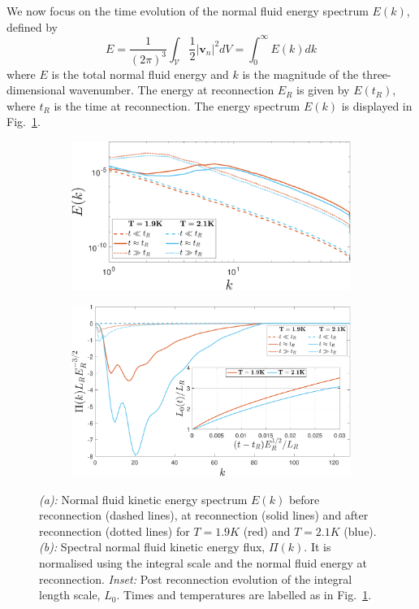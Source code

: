 \documentclass[%
 reprint,
 amsmath,amssymb,
 aps,
 prl,
]{revtex4-2}
\def \v{\mathbf{v}}
\begin{document}
{We now focus on the time evolution of the normal fluid energy spectrum $E(k)$, defined by 
\begin{equation}
    E = \frac{1}{(2\pi)^3}\int_{\mathcal{V}}\frac{1}{2}|\v_n|^2 dV = \int_0^{\infty}E(k)dk
\end{equation}
where $E$ is the total normal fluid energy and $k$ is the magnitude of the three-dimensional wavenumber. The energy at reconnection $E_R$ is given by $E(t_R)$, where $t_R$ is the time at reconnection. The energy spectrum $E(k)$ is displayed in Fig.~\ref{fig:kinetic-energy}.
\begin{figure}[h!]
    \centering
    \begin{subfigure}{0.49\textwidth}
        \centering
        \includegraphics*[width=\textwidth]{energy-spec.pdf}
        \caption{}\label{fig:kinetic-energy}
    \end{subfigure}
    \begin{subfigure}{0.49\textwidth}
        \centering
        \includegraphics*[width=\textwidth]{flux-spec.pdf}
        \caption{}\label{fig:energy-flux}
    \end{subfigure}
    \caption{\emph{(a):} Normal fluid kinetic energy spectrum $E(k)$ before 
reconnection (dashed lines), at reconnection (solid lines) 
and after reconnection (dotted lines) for $T=1.9K$ (red)
and $T=2.1K$ (blue).\emph{(b):} Spectral normal fluid kinetic energy flux, $\Pi (k)$. It is normalised using the integral scale and the normal fluid energy at reconnection.
\emph{Inset:} Post reconnection evolution of the integral length scale, $L_0$.
Times and temperatures are labelled as in Fig.~\ref{fig:kinetic-energy}.}
\end{figure}
%

}
\end{document}
